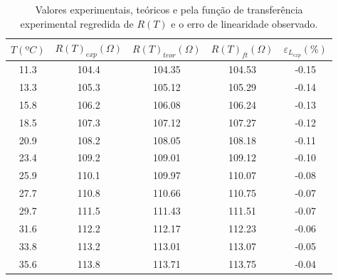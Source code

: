 \documentclass[a4paper]{instrumentacao}
\begin{document}
\begin{table}[H]
\centering
\caption{Valores experimentais, teóricos e pela função de transferência experimental regredida de $R(T)$ e o erro de linearidade observado.}
\label{tab:pt100-exp-teorico-tf-erro}
\begin{tabular}{|c|c|c|c|c|}
\hline
\textbf{$T(ºC)$} & \textbf{$R(T)_{exp}(\Omega)$} & \textbf{$R(T)_{teor}(\Omega)$} & \textbf{$R(T)_{ft}(\Omega)$} & \textbf{$\varepsilon_{L_{exp}}(\%)$} \\ \hline
11.3           & 104.4                 & 104.35                     & 104.53                & -0.15                        \\ \hline
13.3           & 105.3                 & 105.12                     & 105.29                & -0.14                        \\ \hline
15.8           & 106.2                 & 106.08                     & 106.24                & -0.13                        \\ \hline
18.5           & 107.3                 & 107.12                     & 107.27                & -0.12                        \\ \hline
20.9           & 108.2                 & 108.05                     & 108.18                & -0.11                        \\ \hline
23.4           & 109.2                 & 109.01                     & 109.12                & -0.10                        \\ \hline
25.9           & 110.1                 & 109.97                     & 110.07                & -0.08                        \\ \hline
27.7           & 110.8                 & 110.66                     & 110.75                & -0.07                        \\ \hline
29.7           & 111.5                 & 111.43                     & 111.51                & -0.07                        \\ \hline
31.6           & 112.2                 & 112.17                     & 112.23                & -0.06                        \\ \hline
33.8           & 113.2                 & 113.01                     & 113.07                & -0.05                        \\ \hline
35.6           & 113.8                 & 113.71                     & 113.75                & -0.04                        \\ \hline

\end{tabular}
\end{table}
\end{document}
